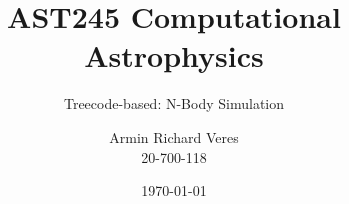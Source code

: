 \documentclass[
	9pt, %
]{beamer}
\title[AST245]{AST245 Computational Astrophysics} %
\subtitle{Treecode-based: N-Body Simulation} %
\author[Armin R. Veres]{Armin Richard Veres\\ 20-700-118} %
\date{\today} %
\begin{document}

\begin{frame}
	\titlepage %
\end{frame}



\begin{frame}
	\tableofcontents %
\end{frame}






\end{document}
